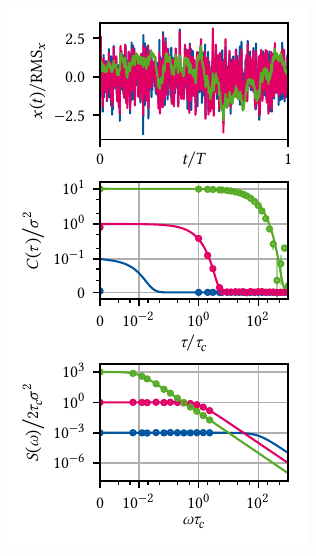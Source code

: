 \begin{marginfigure}[*-6]
    \centering
    \includegraphics{img/pdf/spectrometer/lorentzian_psdcorr}
    \caption[]{
        Ornstein-Uhlenbeck process.
        Simulated time traces (top), autocorrelation function (middle), \gls{psd} (bottom) of the Ornstein-Uhlenbeck process.
        Top: Simluated time traces using the algorithm presented in \cref{ch:ff:time_domain_methods}.
        The data are normalized to the computed \gls{rms} (equal to $\sigma$ in the continuous case).
        Middle: Theoretical autocorrelation function (\cref{eq:speck:ou:autocorrelation}, solid lines) and computed from the simulated data averaged over \num{e3} traces (circles, subset of points).
        Error bars indicate the standard error of the mean, axes are scaled with respect to the parameters of the magenta data, and data are plotted on an $\asinh$-scale.
        Bottom: Theoretical \gls{psd} (\cref{eq:speck:ou:psd}, solid lines) and periodograms computed from the simulated data using , \cf \cref{eq:speck:periodogram}, averaged over \num{e3} traces (circles, subset of points).
        Axes are again scaled with respect to the parameters of the magenta data and plotted on an $\asinh$-scale.
        Parameters are $\tau_c = \dt\times\{\num{e-2},\num{e0},\num{e2}\}$ and $\sigma^2=\sqrt{\tau_c}/4$ for blue, magenta, and green data, respectively.
    }
    \label{fig:speck:psdcorr}
\end{marginfigure}

